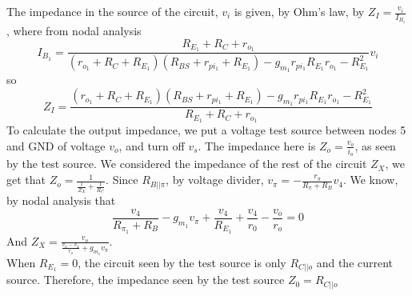 The impedance in the source of the circuit, $v_i$ is given, by Ohm's law, by $Z_I=\frac{v_i}{I_{B_1}}$, where from nodal analysis 
\begin{equation}
    I_{B_1}=\frac{R_{E_1}+R_C+r_{o_1}}{(r_{o_1}+R_C+R_{E_1})(R_{BS}+r_{pi_1}+R_{E_1})-g_{m_1}r_{pi_1}R_{E_1}r_{o_1}-R_{E_1}^2}v_i
\end{equation}
so 
\begin{equation}\label{eq:zi}
Z_I=\frac{(r_{o_1}+R_C+R_{E_1})(R_{BS}+r_{pi_1}+R_{E_1})-g_{m_1}r_{pi_1}R_{E_1}r_{o_1}-R_{E_1}^2}{R_{E_1}+R_C+r_{o_1}}
\end{equation}
To calculate the output impedance, we put a voltage test source between nodes 5 and GND of voltage $v_o$, and turn off $v_s$. The impedance here is $Z_o=\frac{v_o}{i_o}$, as seen by the test source. We considered the impedance of the rest of the circuit $Z_X$, we get that $Z_o=\frac{1}{\frac{1}{Z_X}+\frac{1}{R_C}}$.
Since $R_{B||\pi}$, by voltage divider, $v_\pi=-\frac{r_{\pi}}{R_\pi +R_B}v_4$.
We know, by nodal analysis that 
\begin{equation}
\frac{v_4}{R_{\pi_1}+R_B}-g_{m_1}v_\pi+\frac{v_4}{R_{E_1}}+\frac{v_4}{r_0}-\frac{v_o}{r_o}=0
\end{equation}
And $Z_X=\frac{v_o}{\frac{v_o-v_4}{r_o}+g_{m_1}v_\pi}$.\\
When $R_{E_1}=0$, the circuit seen by the test source is only $R_{C||o}$ and the current source. Therefore, the impedance seen by the test source $Z_0=R_{C||o}$
